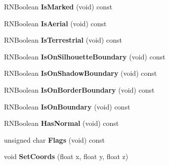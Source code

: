 \begin{DoxyCompactItemize}
\item 
R\+N\+Boolean {\bfseries Is\+Marked} (void) const \hypertarget{class_r3_surfel_abf64bb4387d4ae280911846b56594c1f}{}\label{class_r3_surfel_abf64bb4387d4ae280911846b56594c1f}

\item 
R\+N\+Boolean {\bfseries Is\+Aerial} (void) const \hypertarget{class_r3_surfel_ab94fba832be43a24ec44624fb0c74c92}{}\label{class_r3_surfel_ab94fba832be43a24ec44624fb0c74c92}

\item 
R\+N\+Boolean {\bfseries Is\+Terrestrial} (void) const \hypertarget{class_r3_surfel_a97072c98883341a05036c32e38551055}{}\label{class_r3_surfel_a97072c98883341a05036c32e38551055}

\item 
R\+N\+Boolean {\bfseries Is\+On\+Silhouette\+Boundary} (void) const \hypertarget{class_r3_surfel_a1d7f24f5ed8130f0188689388bbd4eda}{}\label{class_r3_surfel_a1d7f24f5ed8130f0188689388bbd4eda}

\item 
R\+N\+Boolean {\bfseries Is\+On\+Shadow\+Boundary} (void) const \hypertarget{class_r3_surfel_ae3b3bd069c075607c24b48011acdcb1d}{}\label{class_r3_surfel_ae3b3bd069c075607c24b48011acdcb1d}

\item 
R\+N\+Boolean {\bfseries Is\+On\+Border\+Boundary} (void) const \hypertarget{class_r3_surfel_a778d1b901e038a733c07fc9d1cd02bae}{}\label{class_r3_surfel_a778d1b901e038a733c07fc9d1cd02bae}

\item 
R\+N\+Boolean {\bfseries Is\+On\+Boundary} (void) const \hypertarget{class_r3_surfel_add276e23464147a768f5929e7c974e5b}{}\label{class_r3_surfel_add276e23464147a768f5929e7c974e5b}

\item 
R\+N\+Boolean {\bfseries Has\+Normal} (void) const \hypertarget{class_r3_surfel_a682a13d2887e071f441309485acf7458}{}\label{class_r3_surfel_a682a13d2887e071f441309485acf7458}

\item 
unsigned char {\bfseries Flags} (void) const \hypertarget{class_r3_surfel_acbc8c1d315cfbad47950f439a7d5efd7}{}\label{class_r3_surfel_acbc8c1d315cfbad47950f439a7d5efd7}

\item 
void {\bfseries Set\+Coords} (float x, float y, float z)\hypertarget{class_r3_surfel_a955683caa3b8332f46c3fe4dae2f4a1a}{}\label{class_r3_surfel_a955683caa3b8332f46c3fe4dae2f4a1a}


\end{DoxyCompactItemize}
